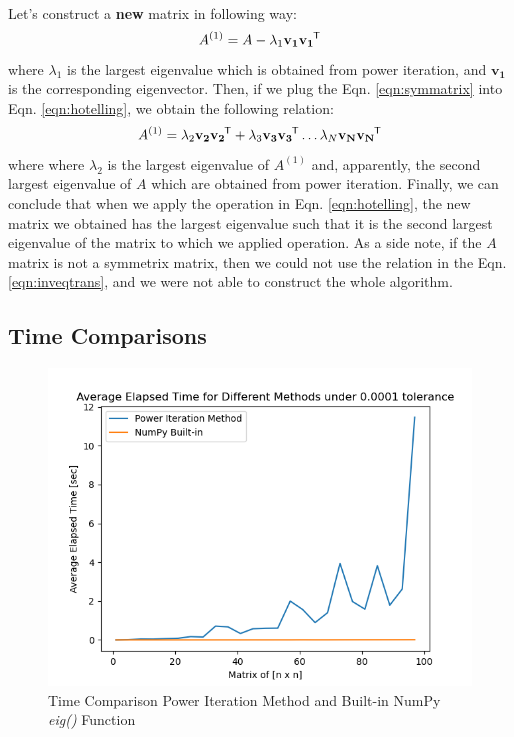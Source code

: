 \documentclass[letterpaper,12pt]{article}
\newcommand*{\tran}{^{\mkern-1.5mu\mathsf{T}}}
\begin{document}
\paragraph{} Let's construct a \textbf{new} matrix in following way:
\begin{equation}
   \label{eqn:hotelling}
   A^{(1)} = A - \lambda_1 \mathbf{v_1}\mathbf{v_1}\tran
\end{equation}
where $\lambda_1$ is the largest eigenvalue which is obtained from power iteration, and $\mathbf{v_1}$ is the corresponding eigenvector. Then, if we plug the Eqn. \ref{eqn:symmatrix} into Eqn. \ref{eqn:hotelling}, we obtain the following relation:
\begin{equation*}
   A^{(1)} = \lambda_2 \mathbf{v_2} \mathbf{v_2}\tran + \lambda_3 \mathbf{v_3} \mathbf{v_3}\tran \dots \lambda_N \mathbf{v_N} \mathbf{v_N}\tran  
\end{equation*}
where where $\lambda_2$ is the largest eigenvalue of $A^{(1)}$ and, apparently, the second largest eigenvalue of $A$ which are obtained from power iteration. Finally, we can conclude that when we apply the operation in Eqn. \ref{eqn:hotelling}, the new matrix we obtained has the largest eigenvalue such that it is the second largest eigenvalue of the matrix to which we applied operation. As a side note, if the $A$ matrix is not a symmetrix matrix, then we could not use the relation in the Eqn. \ref{eqn:inveqtrans}, and we were not able to construct the whole algorithm.

\subsection{Time Comparisons}
\begin{figure}[H] 
   \centering \includegraphics[width=\columnwidth]{figures/poweriterationtime.png}           
                  \caption{Time Comparison Power Iteration Method and Built-in NumPy \textit{eig()} Function}                
                     \label{fig:poweriterationtime}
   \end{figure}
\end{document}
